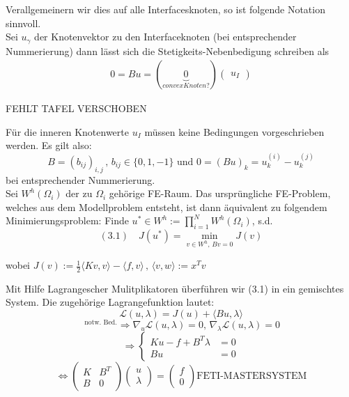 Verallgemeinern wir dies auf alle Interfacesknoten, so ist folgende Notation sinnvoll. \\
Sei $u_\gamma$ der Knotenvektor zu den Interfaceknoten (bei entsprechender Nummerierung) dann lässt sich die Stetigkeits-Nebenbedigung schreiben als 
\begin{align}
  0 = Bu = (\underbrace{0}_{convex Knoten?})
  \begin{pmatrix}
    u_I 
  \end{pmatrix}
  \label{}
\end{align}

FEHLT TAFEL VERSCHOBEN

Für die inneren Knotenwerte $u_I$ müssen keine Bedingungen vorgeschrieben werden. Es gilt also:
\[ B=(b_{ij})_{i,j}\, , \, b_{ij}\in \{ 0,1,-1 \} \text{ und } 0 = (Bu)_k=u^{(i)}_k - u^{(j)}_k \]
bei entsprechender Nummerierung.\\

Sei $W^h(\Omega_i)$ der zu $\Omega_i$ gehörige FE-Raum. Das ursprüngliche FE-Problem, welches aus dem Modellproblem entsteht, ist dann äquivalent zu folgendem Minimierungsproblem:
Finde $u^* \in W^h := \prod_{i=1}^N W^h (\Omega_i)$, s.d.
\[(3.1) \quad J(u^*) = \min_{v \in W^h, \, Bv=0} J(v) \]

wobei $J(v):=\frac{1}{2} \langle Kv,v\rangle - \langle f,v \rangle\, , \, \langle v , w \rangle := x^Tv$

Mit Hilfe Lagrangescher Mulitplikatoren überführen wir (3.1) in ein gemischtes System. Die zugehörige Lagrangefunktion lautet:
\[ \mathcal{L}(u,\lambda)=J(u)+\langle Bu,\lambda \rangle \]
\[^{\text{ notw. Bed.}}\Rightarrow \nabla_u \mathcal{L} (u,\lambda)=0,\, \nabla_\lambda \mathcal{L} (u,\lambda)=0  \]
\[\Rightarrow 
  \begin{cases} 
    Ku-f+B^T\lambda &=0 \\
    Bu &= 0
  \end{cases}
\]
\[ 
  \Leftrightarrow
  \begin{pmatrix}
    K & B^T \\
    B & 0 
  \end{pmatrix} 
  \begin{pmatrix}
    u \\
    \lambda 
  \end{pmatrix} 
  = 
  \begin{pmatrix} 
    f \\
    0 
  \end{pmatrix}  
  \boxed{\text{FETI-MASTERSYSTEM}} 
\]

